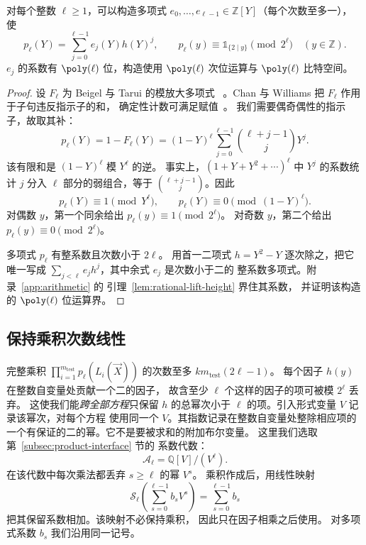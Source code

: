 \begin{lemma}\label{lem:rational-idempotent}
对每个整数 $\ell\ge1$，可以构造多项式
$e_0,\ldots,e_{\ell-1}\in\mathbb Z[Y]$（每个次数至多一），
使
\begin{equation}\label{eq:idempotent-expansion}
 p_\ell(Y)=\sum_{j=0}^{\ell-1}e_j(Y)h(Y)^j,
 \qquad
 p_\ell(y)\equiv\mathds{1}_{\{2\mid y\}}\pmod{2^\ell}
 \quad(y\in\mathbb Z).
\end{equation}
$e_j$ 的系数有 $\poly(\ell)$ 位，构造使用 $\poly(\ell)$
次位运算与 $\poly(\ell)$ 比特空间。
\end{lemma}
\begin{proof}
设 $F_\ell$ 为 Beigel 与 Tarui 的模放大多项式
~\cite[Section~2.3]{BT94}。Chan 与 Williams
把 $F_\ell$ 作用于子句违反指示子的和，
确定性计数可满足赋值~\cite[Theorem~2.5 and proof of Theorem~1.6]{CW21}。
我们需要偶奇偶性的指示子，故取其补：
\begin{equation}\label{eq:binary-indicator}
 p_\ell(Y)=1-F_\ell(Y)=(1-Y)^\ell
       \sum_{j=0}^{\ell-1}\binom{\ell+j-1}{j}Y^j.
\end{equation}
该有限和是 $(1-Y)^\ell$ 模 $Y^\ell$ 的逆。
事实上，$(1+Y+Y^2+\cdots)^\ell$ 中 $Y^j$ 的系数统计 $j$
分入 $\ell$ 部分的弱组合，等于
$\binom{\ell+j-1}{j}$。因此
\[
 p_\ell(Y)\equiv1\pmod{Y^\ell},
 \qquad
 p_\ell(Y)\equiv0\pmod{(1-Y)^\ell}.
\]
对偶数 $y$，第一个同余给出
$p_\ell(y)\equiv1\pmod{2^\ell}$。
对奇数 $y$，第二个给出 $p_\ell(y)\equiv0\pmod{2^\ell}$。

多项式 $p_\ell$ 有整系数且次数小于 $2\ell$。
用首一二项式 $h=Y^2-Y$ 逐次除之，把它唯一写成
$\sum_{j<\ell}e_jh^j$，其中余式 $e_j$ 是次数小于二的
整系数多项式。附录~\ref{app:arithmetic} 的
引理~\ref{lem:rational-lift-height} 界住其系数，
并证明该构造的 $\poly(\ell)$ 位运算界。
\end{proof}

\subsection{保持乘积次数线性}
完整乘积 $\prod_{i=1}^{m_{\mathrm{test}}} p_\ell(L_i(\vec{X}))$
的次数至多 $km_{\mathrm{test}}(2\ell-1)$。
每个因子 $h(y)$ 在整数自变量处贡献一个二的因子，
故含至少 $\ell$ 个这样的因子的项可被模 $2^\ell$ 丢弃。
这使我们能\emph{跨全部方程}只保留 $h$ 的总幂次小于
$\ell$ 的项。引入形式变量 $V$ 记录该幂次，对每个方程
使用同一个 $V$。其指数记录在整数自变量处整除相应项的
一个有保证的二的幂。它不是要被求和的附加布尔变量。
这里我们选取第~\ref{subsec:product-interface} 节的
系数代数：
\[
 \mathcal A_\ell=\mathbb Q[V]/(V^\ell).
\]
在该代数中每次乘法都丢弃 $s\ge\ell$ 的幂 $V^s$。
乘积作成后，用线性映射
\[
 \mathcal S_\ell\!\left(\sum_{s=0}^{\ell-1}b_sV^s\right)
 =\sum_{s=0}^{\ell-1}b_s
\]
把其保留系数相加。该映射不必保持乘积，
因此只在因子相乘之后使用。
对多项式系数 $b_s$ 我们沿用同一记号。

